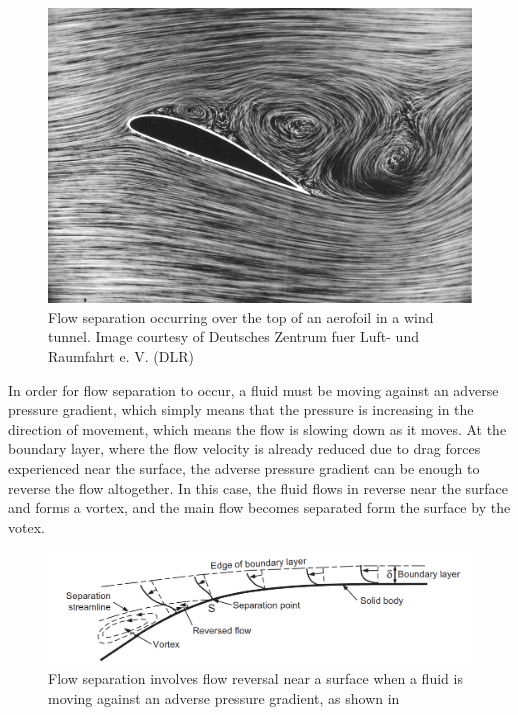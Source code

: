 \documentclass{article}\usepackage[]{graphicx}\usepackage[]{color}
\begin{document}
\begin{figure}
\includegraphics[width=\textwidth]{SeparatedAerofoil.jpg}
\caption{Flow separation occurring over the top of an aerofoil in a wind tunnel. Image courtesy of Deutsches Zentrum fuer Luft- und Raumfahrt e. V. (DLR)}
\label{fig:SeparatedAerofoil.jpg}
\end{figure}

In order for flow separation to occur, a fluid must be moving against an adverse pressure gradient, which simply means that the pressure is increasing in the direction of movement, which means the flow is slowing down as it moves.  At the boundary layer, where the flow velocity is already reduced due to drag forces experienced near the surface, the adverse pressure gradient can be enough to reverse the flow altogether.  In this case, the fluid flows in reverse near the surface and forms a vortex, and the main flow becomes separated form the surface by the votex.

\begin{figure}
\includegraphics[width=\textwidth]{FlowSeparation.png}
\caption{Flow separation involves flow reversal near a surface when a fluid is moving against an adverse pressure gradient, as shown in \parencite{mollard2011}}
\label{fig:FlowSeparation.png}
\end{figure}
\end{document}

